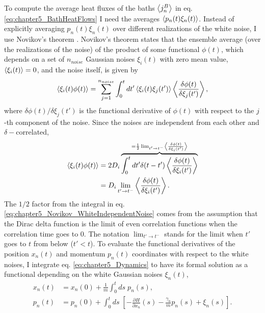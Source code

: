To compute the average heat fluxes of the baths $\expval{j^B_n}$ in eq. \eqref{eq:chapter5_BathHeatFlows} I need
the averages $\expval{p_n(t)\xi_n(t)}$. Instead of explicitly averaging $p_n(t)\xi_n(t)$ over different realizations of the white noise, I use Novikov's theorem \cite{Novikov1965,Ma2011,Toral2014}. Novikov's theorem states that the ensemble average (over  the realizations of the noise) of the product of some functional $\phi(t)$, which depends on a set of
$n_{noise}$ Gaussian noises $\xi_i(t)$ with zero mean value, $\expval{\xi_i(t)} = 0$, and the noise itself, is given by
%
\begin{equation}
    \expval{\xi_i(t)\phi(t)} = \sum_{j=1}^{n_{noise}}\int_0^t dt' \expval{\xi_i(t)\xi_j(t')} \expval{\frac{\delta \phi(t)}{\delta\xi_j(t')}},
    \label{eq:chapter5_Novikov_GeneralExpression}
\end{equation}
%
where ${\delta \phi(t)}/{\delta\xi_j(t')}$ is the functional derivative of $\phi(t)$ with respect to the $j$-th component of the noise. Since the noises are independent from each other and $\delta-$correlated,
%
\begin{equation}
  \begin{split}
    \expval{\xi_i(t)\phi(t)} &= 2D_i \overbrace{\int_0^t dt' \delta(t-t') \expval{\frac{\delta \phi(t)}{\delta\xi_i(t')}}}^{= \frac{1}{2} \lim_{t'\to t^-} \expval{\frac{\delta \phi(t)}{\delta\xi_i(t')}} }\\
    &=D_i \lim_{t'\to t^-} \expval{ \frac{\delta \phi(t)}{\delta\xi_i(t')} }.
  \end{split}
  \label{eq:chapter5_Novikov_WhiteIndependentNoise}
\end{equation}
%
The $1/2$ factor from the integral in eq. \eqref{eq:chapter5_Novikov_WhiteIndependentNoise} comes from the assumption that the Dirac delta function is the limit of even correlation functions when the correlation time goes to 0. The notation $\lim_{t'\to t^-}$ stands for the limit when $t'$ goes to $t$ from below ($t'<t$). To evaluate the functional derivatives of the position $x_n(t)$ and momentum $p_n(t)$ coordinates with respect to the white noises, I integrate eq. \eqref{eq:chapter5_Dynamics} to have its formal solution as a functional depending on the white Gaussian noises $\xi_n(t)$,
%
\begin{equation}
    \begin{split}
        x_n(t) &= x_n(0) +  \frac{1}{m}\int_0^t ds\; p_n(s) ,\\
        p_n(t) &= p_n(0) + \int_0^t ds\; \left[ -\frac{\partial H}{\partial x_n}(s) - \frac{\gamma_n}{m}p_n(s) + \xi_n(s)\right].
    \end{split}
    \label{eq:chapter5_FormalSolution}
\end{equation}
